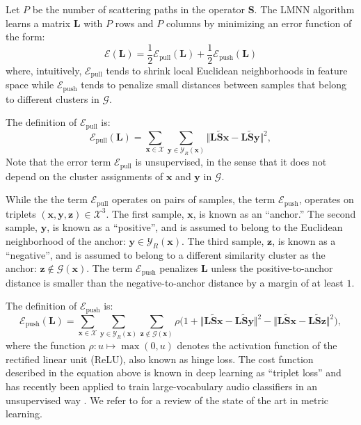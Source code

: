 \documentclass{bmcart}
\begin{document}
Let $P$ be the number of scattering paths in the operator $\mathbf{S}$. The LMNN algorithm learns a matrix $\mathbf{L}$ with $P$ rows and $P$ columns by minimizing an error function of the form:
\begin{equation}
\mathcal{E}(\mathbf{L}) = \frac{1}{2} \mathcal{E}_{\textrm{pull}} (\mathbf{L}) + \frac{1}{2} \mathcal{E}_{\textrm{push}} (\mathbf{L})
\end{equation}
where, intuitively, $\mathcal{E}_{\textrm{pull}}$ tends to shrink local Euclidean neighborhoods in feature space while $\mathcal{E}_{\textrm{push}}$ tends to penalize small distances between samples that belong to different clusters in $\mathcal{G}$.

The definition of $\mathcal{E}_{\textrm{pull}}$ is:
\begin{equation}
\mathcal{E}_{\textrm{pull}} (\mathbf{L}) =
\sum_{\boldsymbol{x}\in\mathcal{X}}
\sum_{\boldsymbol{y}\in\mathcal{Y}_R (\boldsymbol{x})}
\big\Vert
\mathbf{L}\mathbf{\widetilde{S}}\boldsymbol{x} - \mathbf{L}\mathbf{\widetilde{S}}\boldsymbol{y}
\big\Vert^2,
\end{equation}
Note that the error term $\mathcal{E}_\textrm{pull}$ is unsupervised, in the sense that it does not depend on the cluster assignments of $\boldsymbol{x}$ and $\boldsymbol{y}$ in $\mathcal{G}$.

While the the term $\mathcal{E}_{\textrm{pull}}$ operates on pairs of samples, the term $\mathcal{E}_{\textrm{push}}$, operates on triplets $(\boldsymbol{x}, \boldsymbol{y}, \boldsymbol{z})\in\mathcal{X}^3$.
The first sample, $\boldsymbol{x}$, is known as an ``anchor.''
The second sample, $\boldsymbol{y}$, is known as a ``positive'', and is assumed to belong to the Euclidean neighborhood of the anchor: $\boldsymbol{y} \in \mathcal{Y}_R (\boldsymbol{x})$.
The third sample, $\boldsymbol{z}$, is known as a ``negative'', and is assumed to belong to a different similarity cluster as the anchor: $\boldsymbol{z}\not\in\mathcal{G}(\boldsymbol{x})$.
The term $\mathcal{E}_{\textrm{push}}$ penalizes $\mathbf{L}$ unless the positive-to-anchor distance is smaller than the negative-to-anchor distance by a margin of at least $1$.

The definition of $\mathcal{E}_{\textrm{push}}$ is:
\begin{equation}
\mathcal{E}_{\textrm{push}} (\mathbf{L}) =
\sum_{\boldsymbol{x}\in\mathcal{X}}
\sum_{\boldsymbol{y}\in\mathcal{Y}_R (\boldsymbol{x})}
\sum_{\boldsymbol{z}\not\in\mathcal{G}(\boldsymbol{x})}
\rho
\Big(
1 +
\big\Vert
\mathbf{L}\mathbf{\widetilde{S}}\boldsymbol{x} - \mathbf{L}\mathbf{\widetilde{S}}\boldsymbol{y}
\big\Vert^2
-
\big\Vert
\mathbf{L}\mathbf{\widetilde{S}}\boldsymbol{x} - \mathbf{L}\mathbf{\widetilde{S}}\boldsymbol{z}
\big\Vert^2
\Big),
\end{equation}
where the function $\rho : u \mapsto \max (0, u)$ denotes the activation function of the rectified linear unit (ReLU), also known as hinge loss.
The cost function described in the equation above is known in deep learning as ``triplet loss'' and has recently been applied to train large-vocabulary audio classifiers in an unsupervised way \cite{jansen2018icassp}.
We refer to \cite{bellet2015book} for a review of the state of the art in metric learning.
\end{document}
